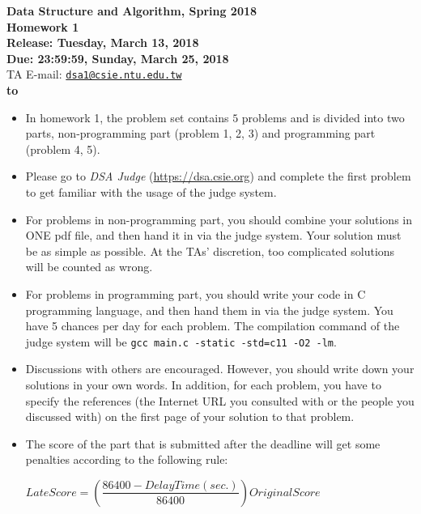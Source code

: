 \documentclass[12pt,a4paper]{report}
\theoremstyle{definition}
\theoremstyle{definition}
\def\headline#1{\hbox to \hsize{\hrulefill\quad\lower.3em\hbox{#1}\quad\hrulefill}}
\def\headline#1{\hbox to \hsize{\hrulefill\quad\lower.3em\hbox{#1}\quad\hrulefill}}
\begin{document}
\begin{center}
\textbf{\Large Data Structure and Algorithm, Spring 2018\\}
\textbf{\Large Homework 1\\} 
\vspace{5pt}
\textbf{Release: Tuesday, March 13, 2018}\\
\textbf{Due: 23:59:59, Sunday, March 25, 2018}\\
TA E-mail: \href{mailto:dsa1@csie.ntu.edu.tw}{\texttt{dsa1@csie.ntu.edu.tw}}\\
\vspace{5pt}
\textbf{\headline{Rules and Instructions}}
\begin{itemize}
    \item In homework 1, the problem set contains $5$ problems and is divided into two parts, non-programming part (problem 1, 2, 3)  and programming part (problem 4, 5). 
    \item Please go to \textit{DSA Judge} (\url{https://dsa.csie.org}) and complete the first problem to get familiar with the usage of the judge system.
    \item For problems in non-programming part, you should combine your solutions in ONE pdf file, and then hand it in via the judge system. Your solution must be as simple as possible. At the TAs' discretion, too complicated solutions will be counted as wrong.
    \item For problems in programming part, you should write your code in C programming language, and then hand them in via the judge system. You have 5 chances per day for each problem. The compilation command of the judge system will be \texttt{gcc main.c -static -std=c11 -O2 -lm}.
    \item Discussions with others are encouraged. However, you should write down your solutions in your own words. In addition, for each problem, you have to specify the references (the Internet URL you consulted with or the people you discussed with) on the first page of your solution to that problem.
    \item The score of the part that is submitted after the deadline will get some penalties according to the following rule:
    \begin{center}
        $LateScore = (\dfrac{86400-DelayTime (sec.)}{86400})OriginalScore$
    \end{center}

\end{itemize}

\end{center}
\newpage
\end{document}
